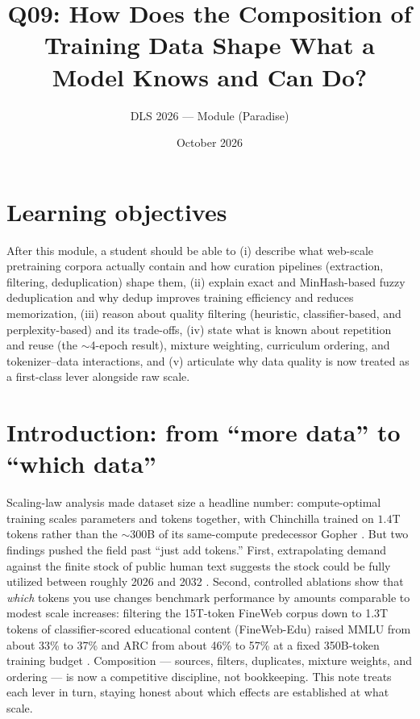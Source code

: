 \documentclass[11pt]{article}
\title{Q09: How Does the Composition of Training Data Shape What a Model Knows and Can Do?}
\author{DLS 2026 --- Module (Paradise)}
\date{October 2026}
\begin{document}
\maketitle

\section*{Learning objectives}
After this module, a student should be able to (i) describe what web-scale pretraining corpora actually contain and how curation pipelines (extraction, filtering, deduplication) shape them, (ii) explain exact and MinHash-based fuzzy deduplication and why dedup improves training efficiency and reduces memorization, (iii) reason about quality filtering (heuristic, classifier-based, and perplexity-based) and its trade-offs, (iv) state what is known about repetition and reuse (the $\sim$4-epoch result), mixture weighting, curriculum ordering, and tokenizer--data interactions, and (v) articulate why data quality is now treated as a first-class lever alongside raw scale.

\section{Introduction: from ``more data'' to ``which data''}
Scaling-law analysis made dataset size a headline number: compute-optimal training scales parameters and tokens together, with Chinchilla trained on $1.4$T tokens rather than the $\sim$300B of its same-compute predecessor Gopher \cite{hoffmann2022chinchilla}. But two findings pushed the field past ``just add tokens.'' First, extrapolating demand against the finite stock of public human text suggests the stock could be fully utilized between roughly 2026 and 2032 \cite{villalobos2024will}. Second, controlled ablations show that \emph{which} tokens you use changes benchmark performance by amounts comparable to modest scale increases: filtering the 15T-token FineWeb corpus down to 1.3T tokens of classifier-scored educational content (FineWeb-Edu) raised MMLU from about 33\% to 37\% and ARC from about 46\% to 57\% at a fixed 350B-token training budget \cite{penedo2024fineweb}. Composition --- sources, filters, duplicates, mixture weights, and ordering --- is now a competitive discipline, not bookkeeping. This note treats each lever in turn, staying honest about which effects are established at what scale.
\end{document}
